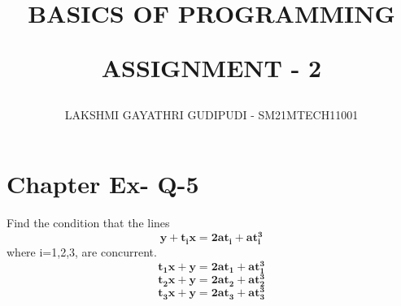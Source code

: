 \documentclass[journal,12pt,twocolumn]{IEEEtran}
\begin{document}
\newcommand{\myvec}[1]{\ensuremath{\begin{pmatrix}#1\end{pmatrix}}}
\newcommand{\cmyvec}[1]{\ensuremath{\begin{pmatrix*}[c]#1\end{pmatrix*}}}
\providecommand{\norm}[1]{\lVert#1\rVert}
\newcommand{\mydet}[1]{\ensuremath{\begin{vmatrix}#1\end{vmatrix}}}
\newcommand{\proj}[2]{\textbf{proj}_{\vec{#1}}\vec{#2}}
\newcommand{\abs}[1]{\left\lvert#1\right\rvert}
\newcommand{\RNum}[1]{\uppercase\expandafter{\romannumeral #1\relax}}
\newcommand{\Rnum}[1]{\lowercase\expandafter{\romannumeral #1\relax}}
\let\StandardTheFigure\thefigure
\let\vec\mathbf

\title{
BASICS OF PROGRAMMING

ASSIGNMENT - 2
}
\author{ LAKSHMI GAYATHRI GUDIPUDI - SM21MTECH11001}
\maketitle
\newpage
\bigskip
\renewcommand{\thefigure}{\theenumi}

\section*{ Chapter \RNum{3} Ex-\RNum{4} Q-5}
\noindent
Find the condition that the lines
$$\mathbf{y+t_i x=2at_i+at_i^3}$$
where i=1,2,3, are concurrent. 
$$\mathbf{t_1 x + y = 2at_1 +at_1^3}$$
$$\mathbf{t_2 x + y = 2at_2 +at_2^3}$$
$$\mathbf{t_3 x + y = 2at_3 +at_3^3}$$
\noindent
\end{document}
